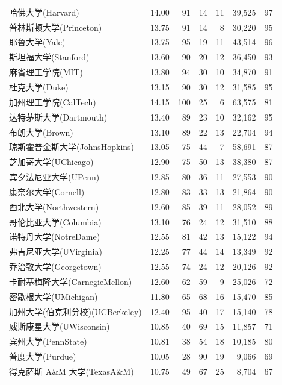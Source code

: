 \begin{mvtable}
\begin{longtable}{lrrrrrr}
哈佛大学(Harvard) & 14.00 & 91 & 14 & 11 & 39{,}525 & 97 \\
普林斯顿大学(Princeton) & 13.75 & 91 & 14 & 8 & 30{,}220 & 95 \\
耶鲁大学(Yale) & 13.75 & 95 & 19 & 11 & 43{,}514 & 96 \\
斯坦福大学(Stanford) & 13.60 & 90 & 20 & 12 & 36{,}450 & 93 \\
麻省理工学院(MIT) & 13.80 & 94 & 30 & 10 & 34{,}870 & 91 \\
杜克大学(Duke) & 13.15 & 90 & 30 & 12 & 31{,}585 & 95 \\
加州理工学院(CalTech) & 14.15 & 100 & 25 & 6 & 63{,}575 & 81 \\
达特茅斯大学(Dartmouth) & 13.40 & 89 & 23 & 10 & 32{,}162 & 95 \\
布朗大学(Brown) & 13.10 & 89 & 22 & 13 & 22{,}704 & 94 \\
琼斯霍普金斯大学(JohnsHopkins) & 13.05 & 75 & 44 & 7 & 58{,}691 & 87 \\
芝加哥大学(UChicago) & 12.90 & 75 & 50 & 13 & 38{,}380 & 87 \\
宾夕法尼亚大学(UPenn) & 12.85 & 80 & 36 & 11 & 27{,}553 & 90 \\
康奈尔大学(Cornell) & 12.80 & 83 & 33 & 13 & 21{,}864 & 90 \\
西北大学(Northwestern) & 12.60 & 85 & 39 & 11 & 28{,}052 & 89 \\
哥伦比亚大学(Columbia) & 13.10 & 76 & 24 & 12 & 31{,}510 & 88 \\
诺特丹大学(NotreDame) & 12.55 & 81 & 42 & 13 & 15{,}122 & 94 \\
弗吉尼亚大学(UVirginia) & 12.25 & 77 & 44 & 14 & 13{,}349 & 92 \\
乔治敦大学(Georgetown) & 12.55 & 74 & 24 & 12 & 20{,}126 & 92 \\
卡耐基梅隆大学(CarnegieMellon) & 12.60 & 62 & 59 & 9 & 25{,}026 & 72 \\
密歇根大学(UMichigan) & 11.80 & 65 & 68 & 16 & 15{,}470 & 85 \\
加州大学(伯克利分校)(UCBerkeley) & 12.40 & 95 & 40 & 17 & 15{,}140 & 78 \\
威斯康星大学(UWisconsin) & 10.85 & 40 & 69 & 15 & 11{,}857 & 71 \\
宾州大学(PennState) & 10.81 & 38 & 54 & 18 & 10{,}185 & 80 \\
普度大学(Purdue) & 10.05 & 28 & 90 & 19 & 9{,}066 & 69 \\
得克萨斯 A\&M 大学(TexasA\&M) & 10.75 & 49 & 67 & 25 & 8{,}704 & 67 \\
\end{longtable}
\end{mvtable}

